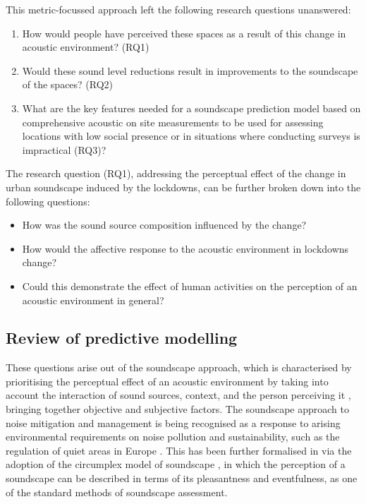  This metric-focussed approach left the following research questions unanswered:

\begin{enumerate}
  \item How would people have perceived these spaces as a result of this change in acoustic environment? (RQ1)
  \item Would these sound level reductions result in improvements to the soundscape of the spaces? (RQ2)
  \item What are the key features needed for a soundscape prediction model based on comprehensive acoustic on site measurements to be used for assessing locations with low social presence or in situations where conducting surveys is impractical (RQ3)?
\end{enumerate}

The  research question (RQ1), addressing the perceptual effect of the change in urban soundscape induced by the lockdowns, can be further broken down into the following questions:

\begin{itemize}
  \item How was the sound source composition influenced by the change?
  \item How would the affective response to the acoustic environment in lockdowns change?
  \item Could this demonstrate the effect of human activities on the perception of an acoustic environment in general?
\end{itemize}



 \subsection{Review of predictive modelling}
 These questions arise out of the soundscape approach, which is characterised by prioritising the perceptual effect of an acoustic environment by taking into account the interaction of sound sources, context, and the person perceiving it \citep{ISO12913Part1,Truax1999Handbook}, bringing together objective and subjective factors. The soundscape approach to noise mitigation and management is being recognised as a response to arising environmental requirements on noise pollution and sustainability, such as the regulation of quiet areas in Europe \citep{EEA2020Environmental,Aletta2018Towards,Radicchi2021Sound}. This has been further formalised in \citet{ISO12913Part2} via the adoption of the circumplex model of soundscape \citep{Axelsson2010principal}, in which the perception of a soundscape can be described in terms of its pleasantness and eventfulness, as one of the standard methods of soundscape assessment.

